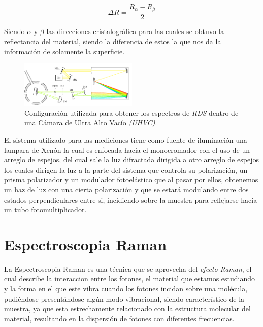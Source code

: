 \begin{equation}
    \label{eqn:ch3-rds-eqn}
    {\Delta R} = \dfrac{R_{\alpha}-R_{\beta}}{2}
\end{equation}

Siendo $ \alpha $ y $ \beta $ las direcciones cristalográfica para las cuales se obtuvo la
reflectancia del material, siendo la diferencia de estos la que nos da la información de solamente la 
superficie.

\begin{figure}[h!]
    \centering
    \includegraphics[width=0.5\textwidth]{figures/chap3/RAS-SETUP-gaby.pdf}
        \caption{Configuración utilizada para obtener los espectros de \textit{RDS} dentro de una Cámara de 
        Ultra Alto Vacío \textit{(UHVC)}.}
    \label{fig:rds-setup}
\end{figure}

El sistema utilizado para las mediciones tiene como fuente de iluminación una lampara de Xenón la cual es
enfocada hacia el monocromador con el uso de un arreglo de espejos, del cual sale la luz difractada dirigida a
otro arreglo de espejos los cuales dirigen la luz a la parte del sistema que controla su polarización, 
un prisma polarizador y un modulador fotoelástico que al pasar por ellos, obtenemos un haz de luz con 
una cierta polarización y que se estará modulando entre dos estados perpendiculares entre si, incidiendo sobre 
la muestra para reflejarse hacia un tubo fotomultiplicador.\cite{LastrasMartnez1993}

\section{Espectroscopia Raman}
\label{sec:chap3-raman}
La Espectroscopia Raman es una técnica que se aprovecha del \textit{efecto Raman}, el cual describe la interaccion
entre los fotones, el material que estamos estudiando y la forma en el que este vibra cuando los fotones incidan 
sobre una molécula, pudiéndose presentándose algún modo vibracional, siendo característico de la muestra, 
ya que esta estrechamente relacionado con la estructura molecular del material, resultando en la dispersión de 
fotones con diferentes frecuencias.\cite{Prasankumar2016}

